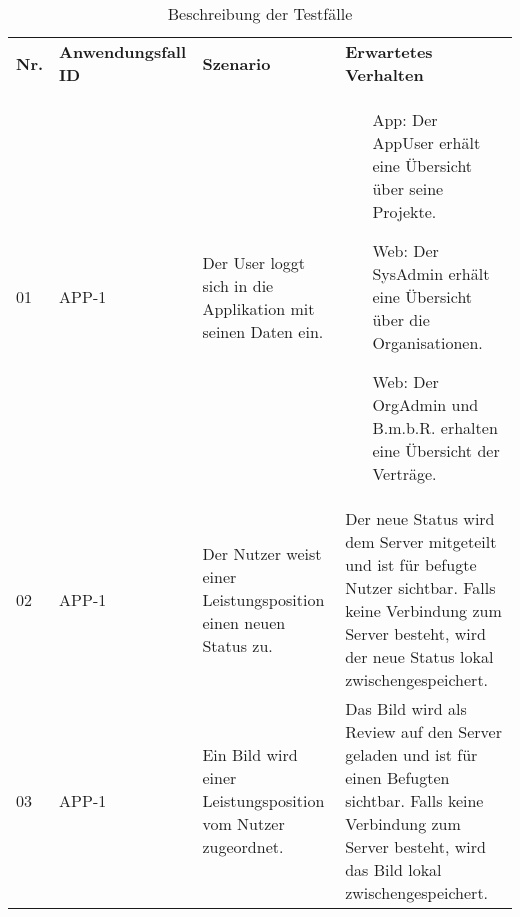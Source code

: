 \centering
\begin{longtable}[c]{|p{1cm}|p{3cm}|p{4cm}|p{6cm}|}
    \caption{Beschreibung der Testfälle}
    \label{fig:testfälle}
    \endlastfoot
    \hline \multicolumn{4}{|r|}{{Weitergeführt auf der folgenden Seite}}                                                                                                                                                                                                                                                                        \\ \hline
    \endfoot
    \hline
    \textbf{Nr.} & \textbf{Anwendungsfall ID} & \textbf{Szenario}                                                                                                  & \textbf{Erwartetes Verhalten}                                                                                                                                              \\ \hline
    \endhead
    \hline
    01           & APP-1                      & Der User loggt sich in die Applikation mit seinen Daten ein.                                                       &
    \begin{itemize}
        \item[App:] Der AppUser erhält eine Übersicht über seine Projekte.
        \item[Web:] Der SysAdmin erhält eine Übersicht über die Organisationen.
        \item[Web:] Der OrgAdmin und B.m.b.R. erhalten eine Übersicht der Verträge.
    \end{itemize}                                                                                                                                                                                                                                                                                                                   \\ \hline
    02           & APP-1                      & Der Nutzer weist einer Leistungsposition einen neuen Status zu.                                                    & Der neue Status wird dem Server mitgeteilt und ist für befugte Nutzer sichtbar. Falls keine Verbindung zum Server besteht, wird der neue Status lokal zwischengespeichert. \\ \hline
    03           & APP-1                      & Ein Bild wird einer Leistungsposition vom Nutzer zugeordnet.                                                       & Das Bild wird als Review auf den Server geladen und ist für einen Befugten sichtbar. Falls keine Verbindung zum Server besteht, wird das Bild lokal zwischengespeichert.   \\ \hline

\end{longtable}
